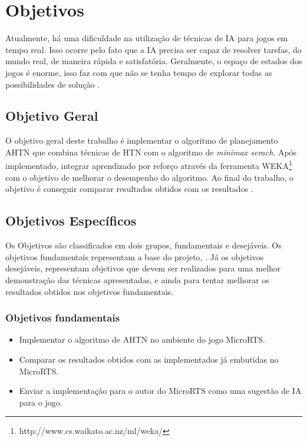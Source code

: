\chapter{\label{chap:obje}Objetivos}

Atualmente, há uma dificuldade na utilização de técnicas de IA para jogos em tempo real. Isso ocorre pelo fato que a IA precisa ser capaz de resolver tarefas, do mundo real, de maneira rápida e satisfatória. Geralmente, o espaço de estados dos jogos é enorme, isso faz com que não se tenha tempo de explorar todas as possibilidades de solução \cite{millington2009artificial}.   

\section{Objetivo Geral}
O objetivo geral deste trabalho é implementar o algoritmo de planejamento AHTN \cite{ontanon2015adversarial} que combina técnicas de HTN com o algoritmo de \textit{minimax serach}. Após implementado, integrar aprendizado por reforço através da ferramenta WEKA\footnote{http://www.cs.waikato.ac.nz/ml/weka/} com o objetivo de melhorar o desempenho do algoritmo. Ao final do trabalho, o objetivo é conseguir comparar resultados obtidos com os resultados \cite{ontanon2012experiments,hogg2010learning,ontanon2013survey}. 

\section{Objetivos Específicos}\label{obj:esp}
Os Objetivos são classificados em dois grupos, fundamentais e desejáveis. Os objetivos fundamentais representam a base do projeto, . Já os objetivos desejáveis, representam objetivos que devem ser realizados para uma melhor demonstração das técnicas apresentadas, e ainda para tentar melhorar os resultados obtidos nos objetivos fundamentais. 
 
\subsection{Objetivos fundamentais} 
\begin{itemize}
	\item Implementar o algoritmo de AHTN no ambiente do jogo MicroRTS.
	\item Comparar os resultados obtidos com as implementados já embutidas no MicroRTS.
	\item Enviar a implementação para o autor do MicroRTS como uma sugestão de IA para o jogo.
\end{itemize}
 
